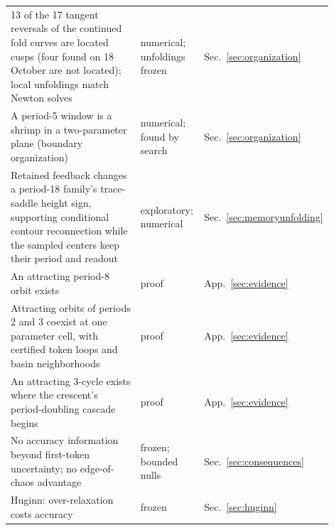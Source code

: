 \documentclass[11pt,letterpaper]{article}
\begin{document}
\begin{table}[tbp]
\begin{tabular}{p{0.56\linewidth}p{0.2\linewidth}p{0.14\linewidth}}
13 of the 17 tangent reversals of the continued fold curves are located cusps (four found on 18 October are not located); local unfoldings match Newton solves & numerical; unfoldings frozen & Sec.~\ref{sec:organization} \\
A period-5 window is a shrimp in a two-parameter plane (boundary organization) & numerical; found by search & Sec.~\ref{sec:organization} \\
Retained feedback changes a period-18 family's trace-saddle height sign, supporting conditional contour reconnection while the sampled centers keep their period and readout & exploratory; numerical & Sec.~\ref{sec:memoryunfolding} \\
An attracting period-8 orbit exists & proof & App.~\ref{sec:evidence} \\
Attracting orbits of periods 2 and 3 coexist at one parameter cell, with certified token loops and basin neighborhoods & proof & App.~\ref{sec:evidence} \\
An attracting 3-cycle exists where the crescent's period-doubling cascade begins & proof & App.~\ref{sec:evidence} \\
No accuracy information beyond first-token uncertainty; no edge-of-chaos advantage & frozen; bounded nulls & Sec.~\ref{sec:consequences} \\
Huginn: over-relaxation costs accuracy & frozen & Sec.~\ref{sec:huginn} \\
\bottomrule
\end{tabular}
\end{table}
\end{document}
